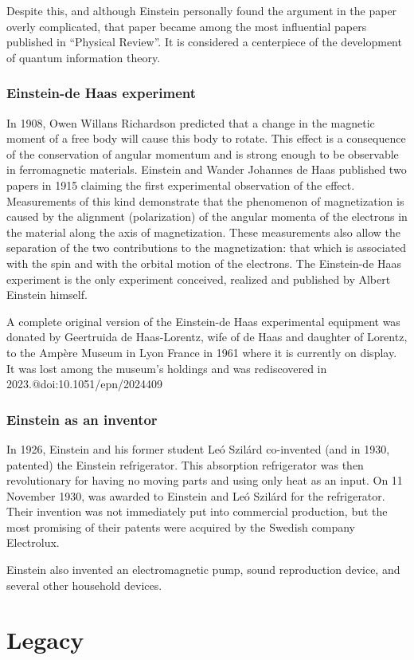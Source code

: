 \documentclass[twoside]{memoir}
\begin{document}
Despite this, and although Einstein personally found the argument in the  paper overly complicated, that paper became among the most influential papers published in \enquote{Physical Review}. It is considered a centerpiece of the development of quantum information theory.
\section{Einstein-de Haas experiment}
In 1908, Owen Willans Richardson predicted that a change in the magnetic moment of a free body will cause this body to rotate. This effect is a consequence of the conservation of angular momentum and is strong enough to be observable in ferromagnetic materials. Einstein and Wander Johannes de Haas published two papers in 1915 claiming the first experimental observation of the effect. Measurements of this kind demonstrate that the phenomenon of magnetization is caused by the alignment (polarization) of the angular momenta of the electrons in the material along the axis of magnetization. These measurements also allow the separation of the two contributions to the magnetization: that which is associated with the spin and with the orbital motion of the electrons. The Einstein-de Haas experiment is the only experiment conceived, realized and published by Albert Einstein himself.

A complete original version of the Einstein-de Haas experimental equipment was donated by Geertruida de Haas-Lorentz, wife of de Haas and daughter of Lorentz, to the Ampère Museum in Lyon France in 1961 where it is currently on display. It was lost among the museum's holdings and was rediscovered in 2023.@doi:10.1051/epn/2024409
\section{Einstein as an inventor}
In 1926, Einstein and his former student Leó Szilárd co-invented (and in 1930, patented) the Einstein refrigerator. This absorption refrigerator was then revolutionary for having no moving parts and using only heat as an input. On 11 November 1930,  was awarded to Einstein and Leó Szilárd for the refrigerator. Their invention was not immediately put into commercial production, but the most promising of their patents were acquired by the Swedish company Electrolux.

Einstein also invented an electromagnetic pump, sound reproduction device, and several other household devices.
\part{Legacy}
\end{document}
